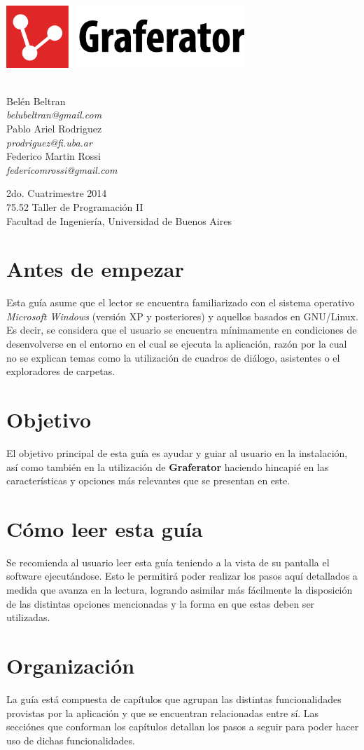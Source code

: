 \documentclass{book}
\makeatletter
\newcommand*{\titleGM}{\begingroup %
\newcommand*{\sepline}{\color{gray85}\rule[0.5ex]{30em}{0.55pt}}
	
	





    	


\begin{center}

	\vspace*{1.5cm} 
	
	\includegraphics[width=9cm]{images/graferator-logo.png} \\[12\baselineskip]

	
	\colorbox{gray95}{
		\parbox[t]{1.0\linewidth}{
			\vspace*{0.7cm} %
			
			\centering {\Huge\bfseries\color{gray50}\fontfamily{fvs}\selectfont Guía de usuario}\par %
			
			\vspace*{0.7cm} %
		}
	}\\[10\baselineskip]


		\Large Belén Beltran \\
		\large \textit{belubeltran@gmail.com} \\ \medskip
		\Large Pablo Ariel Rodriguez \\
		\large \textit{prodriguez@fi.uba.ar} \\ \medskip
		\Large Federico Martin Rossi \\ 
		\large \textit{federicomrossi@gmail.com} \\

		\bigskip\bigskip\bigskip\bigskip

		\large 2do. Cuatrimestre 2014 \\ \smallskip
		\large 75.52 Taller de Programación II \\ \smallskip
		\large Facultad de Ingeniería, Universidad de Buenos Aires \\ \smallskip

\end{center}

\endgroup}
\makeatother
\begin{document}

\thispagestyle{empty}


\titleGM



%
%
\section*{\bfseries\color{black}Antes de empezar}

Esta guía asume que el lector se encuentra familiarizado con el sistema operativo \textit{Microsoft Windows} (versión XP y posteriores) y aquellos basados en GNU/Linux. Es decir, se considera que el usuario se encuentra mínimamente en condiciones de desenvolverse en el entorno en el cual se ejecuta la aplicación, razón por la cual no se explican temas como la utilización de cuadros de diálogo, asistentes o el exploradores de carpetas.
\bigskip


\section*{Objetivo}

El objetivo principal de esta guía es ayudar y guiar al usuario en la instalación, así como también en la utilización de \textbf{Graferator} haciendo hincapié en las características y opciones más relevantes que se presentan en este. 
\bigskip


\section*{\bfseries\color{black}Cómo leer esta guía}

Se recomienda al usuario leer esta guía teniendo a la vista de su pantalla el software ejecutándose. Esto le permitirá poder realizar los pasos aquí detallados a medida que avanza en la lectura, logrando asimilar más fácilmente la disposición de las distintas opciones mencionadas y la forma en que estas deben ser utilizadas.
\bigskip


\section*{\bfseries\color{black}Organización}

La guía está compuesta de capítulos que agrupan las distintas funcionalidades provistas por la aplicación y que se encuentran relacionadas entre sí. Las secciónes que conforman los capítulos detallan los pasos a seguir para poder hacer uso de dichas funcionalidades.
\end{document}
